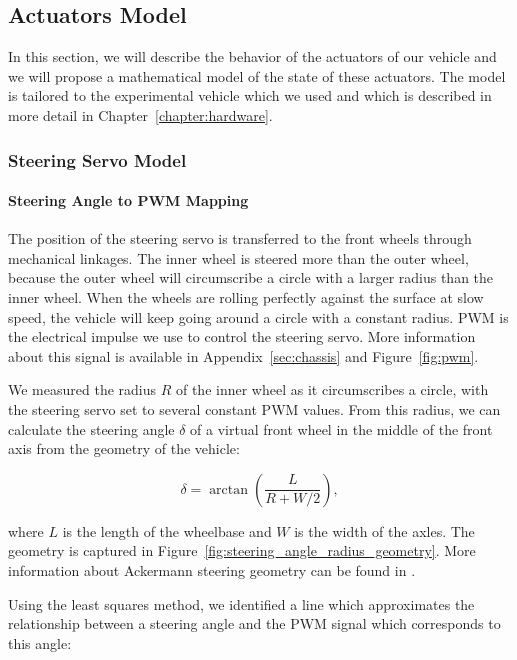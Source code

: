 \subsection{Actuators Model}
\label{sec:actuators_model}

In this section, we will describe the behavior of the actuators of our vehicle and we will propose a mathematical model of the state of these actuators. The model is tailored to the experimental vehicle which we used and which is described in more detail in Chapter~\ref{chapter:hardware}.

\subsubsection{Steering Servo Model}

\paragraph{Steering Angle to \gls{PWM} Mapping}

The position of the steering servo is transferred to the front wheels through mechanical linkages. The inner wheel is steered more than the outer wheel, because the outer wheel will circumscribe a circle with a larger radius than the inner wheel. When the wheels are rolling perfectly against the surface at slow speed, the vehicle will keep going around a circle with a constant radius. \gls{PWM} is the electrical impulse we use to control the steering servo. More information about this signal is available in Appendix~\ref{sec:chassis} and Figure~\ref{fig:pwm}.

We measured the radius $R$ of the inner wheel as it circumscribes a circle, with the steering servo set to several constant \gls{PWM} values. From this radius, we can calculate the steering angle $\delta$ of a virtual front wheel in the middle of the front axis from the geometry of the vehicle:

\begin{equation}
\delta=\arctan\left(\dfrac{L}{R+W/2}\right),
\end{equation}

where $L$ is the length of the wheelbase and $W$ is the width of the axles. The geometry is captured in Figure~\ref{fig:steering_angle_radius_geometry}. More information about Ackermann steering geometry can be found in \cite[Chapter~2]{rajamani}.

Using the least squares method, we identified a line which approximates the relationship between a steering angle and the \gls*{PWM} signal which corresponds to this angle:

